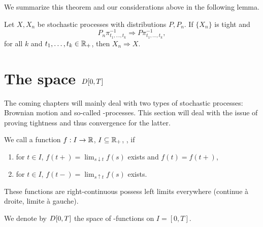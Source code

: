 We summarize this theorem and our considerations above in the following lemma.

\begin{lemma} \label{L: tightness and fidi}
	Let $X, X_n$ be stochastic processes with distributions $P, P_n$.
	If $\{X_n\}$  is tight and
	\begin{equation*}
		P_n\pi^{-1}_{t_1, \dots, t_k} \Rightarrow P\pi^{-1}_{t_1, \dots, t_k},
	\end{equation*}
	for all $k$ and $t_1, \dots, t_k \in \mathbb{R}_+$,
	then $X_n \Rightarrow X$.
\end{lemma}


\section{The space $D[0, T]$} \label{S: space DT}

The coming chapters will mainly deal with two types of stochastic processes:
Brownian motion and so-called \cadlag-processes.
This section will deal with the issue of proving tightness and thus convergence for the latter.

\begin{definition} \label{D: DT}
	We call a function $f: I \rightarrow \mathbb{R}$, $I \subseteq \mathbb{R}_+$, \emph{\cadlag},
	if
	\begin{enumerate}
		\item for $t \in I$, $f(t+) = \lim_{s \downarrow t}f(s)$ exists and $f(t) = f(t+)$,
		\item for $t \in I$, $f(t-) = \lim_{s \uparrow t}f(s)$ exists.
	\end{enumerate}
	These functions are right-continuous possess left limits everywhere (continue à droite, limite à gauche).
	
	We denote by $D[0, T]$ the space of \cadlag-functions on $I = [0,T]$.
\end{definition}

